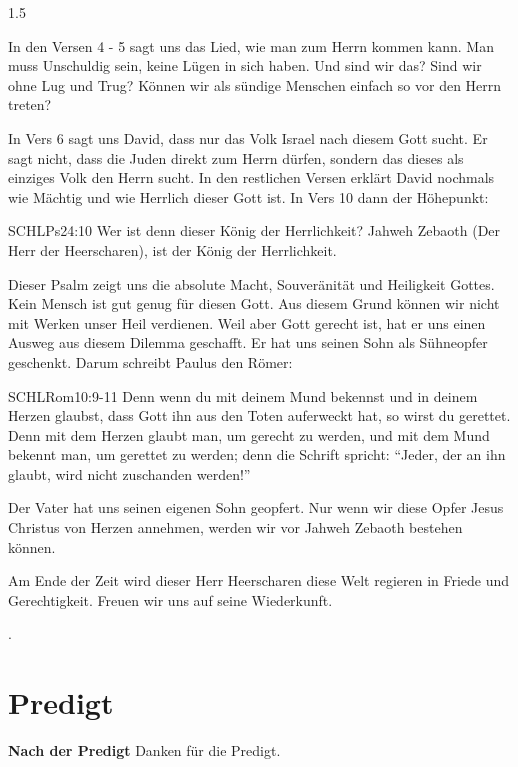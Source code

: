 \documentclass[fontsize=14pt]{../../inc/mybib}
\begin{document}
\begin{spacing}{1.5}
\begin{block}
        In den Versen 4 - 5 sagt uns das Lied, wie man zum Herrn kommen kann. Man muss Unschuldig sein, keine Lügen in sich haben. Und sind wir das? Sind wir ohne Lug und Trug? Können wir als sündige Menschen einfach so vor den Herrn treten? 

        In Vers 6 sagt uns David, dass nur das Volk Israel nach diesem Gott sucht. Er sagt nicht, dass die Juden direkt zum Herrn dürfen, sondern das dieses als einziges Volk den Herrn sucht. In den restlichen Versen erklärt David nochmals wie Mächtig und wie Herrlich dieser Gott ist. In Vers 10 dann der Höhepunkt:
        \begin{bibelbox}{SCHL}{Ps}{24:10}
            Wer ist denn dieser König der Herrlichkeit? Jahweh Zebaoth (Der Herr der Heerscharen),  ist der König der Herrlichkeit.
        \end{bibelbox}
        Dieser Psalm zeigt uns die absolute Macht, Souveränität und Heiligkeit Gottes. Kein Mensch ist gut genug für diesen Gott. Aus diesem Grund können wir nicht mit Werken unser Heil verdienen. Weil aber Gott gerecht ist, hat er uns einen Ausweg aus diesem Dilemma geschafft. Er hat uns seinen Sohn als Sühneopfer geschenkt. Darum schreibt Paulus den Römer:
        \begin{bibelbox}{SCHL}{Rom}{10:9-11}
        Denn wenn du mit deinem Mund bekennst und in deinem Herzen glaubst, dass Gott ihn aus den Toten auferweckt hat, so wirst du gerettet. Denn mit dem Herzen glaubt man, um gerecht zu werden, und mit dem Mund bekennt man, um gerettet zu werden; denn die Schrift spricht: \enquote{Jeder, der an ihn glaubt, wird nicht zuschanden werden!}
        \end{bibelbox}
        Der Vater hat uns seinen eigenen Sohn geopfert. Nur wenn wir diese Opfer Jesus Christus von Herzen annehmen, werden wir vor Jahweh Zebaoth bestehen können. 

        Am Ende der Zeit wird dieser Herr Heerscharen diese Welt regieren in Friede und Gerechtigkeit. Freuen wir uns auf seine Wiederkunft.
    \end{block}
    \begin{block}[Ende]
    \end{block}
    .
\end{spacing}
\section{Predigt}
\textbf{Nach der Predigt}\newline
Danken für die Predigt.
\end{document}
